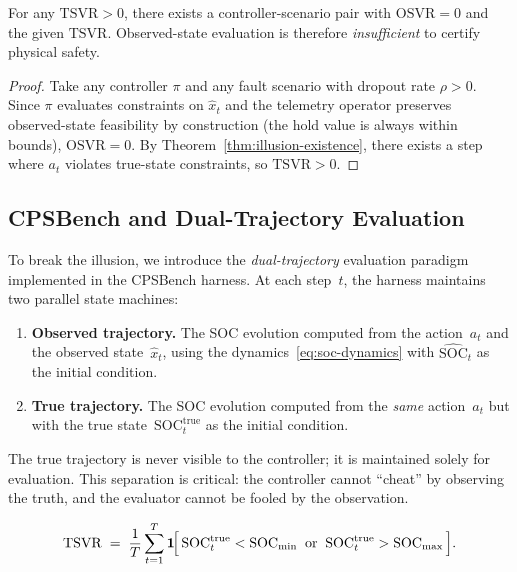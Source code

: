 \begin{proposition}
\label{prop:obs-eval-insufficient}
For any $\mathrm{TSVR} > 0$, there exists a controller-scenario pair
with $\mathrm{OSVR} = 0$ and the given $\mathrm{TSVR}$.  Observed-state
evaluation is therefore \emph{insufficient} to certify physical safety.
\end{proposition}

\begin{proof}
Take any controller $\pi$ and any fault scenario with dropout rate
$\rho > 0$.  Since $\pi$ evaluates constraints on $\hat{x}_t$ and the
telemetry operator preserves observed-state feasibility by construction
(the hold value is always within bounds), $\mathrm{OSVR} = 0$.  By
Theorem~\ref{thm:illusion-existence}, there exists a step where $a_t$
violates true-state constraints, so $\mathrm{TSVR} > 0$.
\end{proof}

\subsection{CPSBench and Dual-Trajectory Evaluation}
\label{sec:cpsbench-dual}

To break the illusion, we introduce the \emph{dual-trajectory} evaluation
paradigm implemented in the CPSBench harness.  At each step~$t$, the
harness maintains two parallel state machines:

\begin{enumerate}
  \item \textbf{Observed trajectory.}  The SOC evolution computed from
    the action~$a_t$ and the observed state~$\hat{x}_t$, using the
    dynamics~\eqref{eq:soc-dynamics} with $\widehat{\mathrm{SOC}}_t$ as
    the initial condition.
  \item \textbf{True trajectory.}  The SOC evolution computed from the
    \emph{same} action~$a_t$ but with the true
    state~$\mathrm{SOC}_t^{\mathrm{true}}$ as the initial condition.
\end{enumerate}

The true trajectory is never visible to the controller; it is maintained
solely for evaluation.  This separation is critical: the controller
cannot ``cheat'' by observing the truth, and the evaluator cannot be
fooled by the observation.

\begin{definition}
\label{def:tsvr}
\[
  \mathrm{TSVR} \;=\; \frac{1}{T} \sum_{t=1}^{T}
  \mathbf{1}\!\Bigl[\,
    \mathrm{SOC}_{t}^{\mathrm{true}} < \mathrm{SOC}_{\min}
    \;\;\text{or}\;\;
    \mathrm{SOC}_{t}^{\mathrm{true}} > \mathrm{SOC}_{\max}
  \,\Bigr].
\]
\end{definition}

